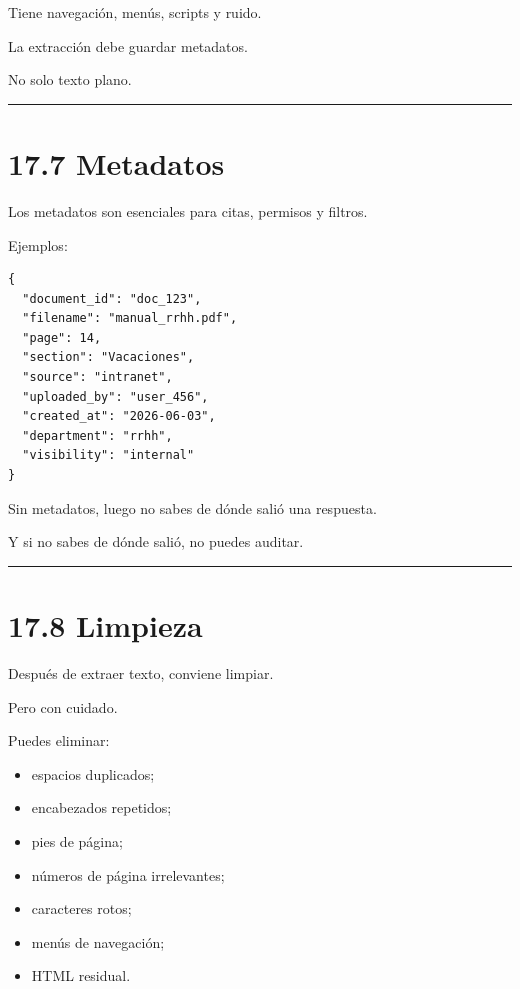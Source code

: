 Tiene navegación, menús, scripts y ruido.

La extracción debe guardar metadatos.

No solo texto plano.

\begin{center}\rule{0.5\linewidth}{0.5pt}\end{center}

\section{17.7 Metadatos}\label{metadatos}

Los metadatos son esenciales para citas, permisos y filtros.

Ejemplos:

\begin{lstlisting}
{
  "document_id": "doc_123",
  "filename": "manual_rrhh.pdf",
  "page": 14,
  "section": "Vacaciones",
  "source": "intranet",
  "uploaded_by": "user_456",
  "created_at": "2026-06-03",
  "department": "rrhh",
  "visibility": "internal"
}
\end{lstlisting}

Sin metadatos, luego no sabes de dónde salió una respuesta.

Y si no sabes de dónde salió, no puedes auditar.

\begin{center}\rule{0.5\linewidth}{0.5pt}\end{center}

\section{17.8 Limpieza}\label{limpieza}

Después de extraer texto, conviene limpiar.

Pero con cuidado.

Puedes eliminar:

\begin{itemize}
\tightlist
\item
  espacios duplicados;
\item
  encabezados repetidos;
\item
  pies de página;
\item
  números de página irrelevantes;
\item
  caracteres rotos;
\item
  menús de navegación;
\item
  HTML residual.
\end{itemize}

